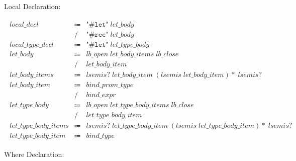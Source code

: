Local Declaration:

\begin{align*}
    \begin{array}{rcll}
        \mathit{local\_decl}
        &\Coloneq &\texttt{"\#let"}\; \mathit{let\_body} \\
        &\mathrel{/} &\texttt{"\#rec"}\; \mathit{let\_body} \\
        \mathit{local\_type\_decl}
        &\Coloneq &\texttt{"\#let"}\; \mathit{let\_type\_body} \\
        \mathit{let\_body}
        &\Coloneq &\mathit{lb\_open}\; \mathit{let\_body\_items}\; \mathit{lb\_close} \\
        &\mathrel{/} &\mathit{let\_body\_item} \\
        \mathit{let\_body\_items}
        &\Coloneq &\mathit{lsemis}{?}\; \mathit{let\_body\_item}\; (\mathit{lsemis}\; \mathit{let\_body\_item}){*}\; \mathit{lsemis}{?} \\
        \mathit{let\_body\_item}
        &\Coloneq &\mathit{bind\_prom\_type} \\
        &\mathrel{/} &\mathit{bind\_expr} \\
        \mathit{let\_type\_body}
        &\Coloneq &\mathit{lb\_open}\; \mathit{let\_type\_body\_items}\; \mathit{lb\_close} \\
        &\mathrel{/} &\mathit{let\_type\_body\_item} \\
        \mathit{let\_type\_body\_items}
        &\Coloneq &\mathit{lsemis}{?}\; \mathit{let\_type\_body\_item}\; (\mathit{lsemis}\; \mathit{let\_type\_body\_item}){*}\; \mathit{lsemis}{?} \\
        \mathit{let\_type\_body\_item}
        &\Coloneq &\mathit{bind\_type}
    \end{array}
\end{align*}

Where Declaration:

